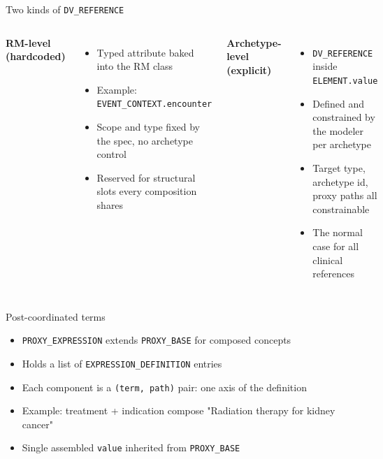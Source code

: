 \documentclass[10pt]{beamer}
\begin{document}
\begin{frame}{Two kinds of \texttt{DV\_REFERENCE}}
  \begin{columns}
      \textbf{RM-level (hardcoded)}
      \begin{itemize}
        \item Typed attribute baked into the RM class
        \item Example: \texttt{EVENT\_CONTEXT.encounter}
        \item Scope and type fixed by the spec, no archetype control
        \item Reserved for structural slots every composition shares
      \end{itemize}
      \textbf{Archetype-level (explicit)}
      \begin{itemize}
        \item \texttt{DV\_REFERENCE} inside \texttt{ELEMENT.value}
        \item Defined and constrained by the modeler per archetype
        \item Target type, archetype id, proxy paths all constrainable
        \item The normal case for all clinical references
      \end{itemize}
  \end{columns}

\end{frame}


\begin{frame}{Post-coordinated terms}
  \begin{itemize}
    \item \texttt{PROXY\_EXPRESSION} extends \texttt{PROXY\_BASE} for composed concepts
    \item Holds a list of \texttt{EXPRESSION\_DEFINITION} entries
    \item Each component is a \texttt{(term, path)} pair: one axis of the definition
    \item Example: treatment + indication compose "Radiation therapy for kidney cancer"
    \item Single assembled \texttt{value} inherited from \texttt{PROXY\_BASE}
  \end{itemize}
\end{frame}
\end{document}
